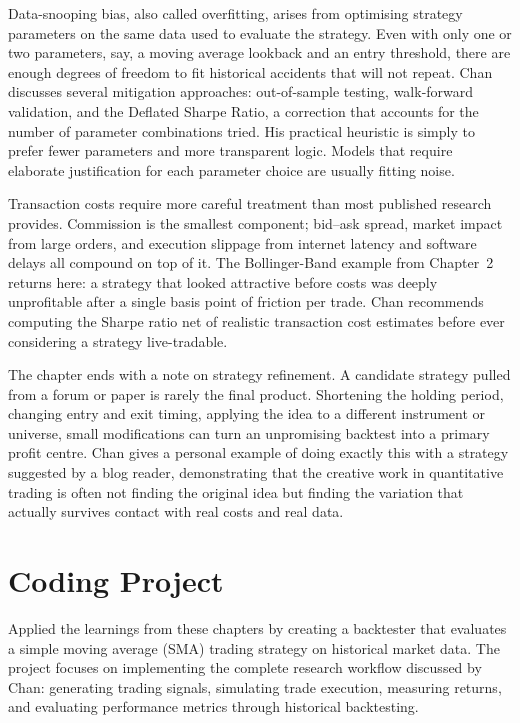 \documentclass[12pt, a4paper]{article}
\begin{document}
Data-snooping bias, also called overfitting, arises from optimising strategy parameters on the same data used to evaluate the strategy. Even with only one or two parameters, say, a moving average lookback and an entry threshold, there are enough degrees of freedom to fit historical accidents that will not repeat. Chan discusses several mitigation approaches: out-of-sample testing, walk-forward validation, and the Deflated Sharpe Ratio, a correction that accounts for the number of parameter combinations tried. His practical heuristic is simply to prefer fewer parameters and more transparent logic. Models that require elaborate justification for each parameter choice are usually fitting noise.

Transaction costs require more careful treatment than most published research provides. Commission is the smallest component; bid--ask spread, market impact from large orders, and execution slippage from internet latency and software delays all compound on top of it. The Bollinger-Band example from Chapter~2 returns here: a strategy that looked attractive before costs was deeply unprofitable after a single basis point of friction per trade. Chan recommends computing the Sharpe ratio net of realistic transaction cost estimates before ever considering a strategy live-tradable.

The chapter ends with a note on strategy refinement. A candidate strategy pulled from a forum or paper is rarely the final product. Shortening the holding period, changing entry and exit timing, applying the idea to a different instrument or universe, small modifications can turn an unpromising backtest into a primary profit centre. Chan gives a personal example of doing exactly this with a strategy suggested by a blog reader, demonstrating that the creative work in quantitative trading is often not finding the original idea but finding the variation that actually survives contact with real costs and real data.



\section{Coding Project}

Applied the learnings from these chapters by creating a backtester that evaluates a simple moving average (SMA) trading strategy on historical market data. The project focuses on implementing the complete research workflow discussed by Chan: generating trading signals, simulating trade execution, measuring returns, and evaluating performance metrics through historical backtesting.
\end{document}
